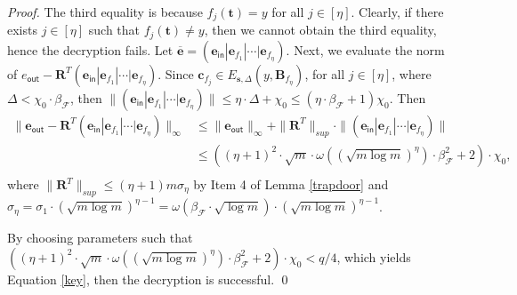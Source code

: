 \documentclass[runningheads,10pt]{llncs}
\begin{document}
\begin{proof}
	The third equality is because  $f_{j}(\textbf{t})=y$  for all $j \in [\eta]$.
		Clearly,  if there exists  $j\in [\eta]$ such that $f_j (\mathbf{t})\neq y$, then we cannot obtain the third equality, hence the decryption fails. 
		 Let $\overline{\textbf{e}}=(\textbf{e}_{\textsf{in}}|\textbf{e}_{f_1}|\cdots|\textbf{e}_{f_\eta})$.
		\fi
Next, we evaluate the norm of $e_{\textsf{out}} -\textbf{R}^T(\textbf{e}_{\textsf{in}}|\textbf{e}_{f_1}|\cdots|\textbf{e}_{f_\eta})$. Since $\textbf{c}_{f_j} \in E_{\textbf{s}, \Delta}(y, \textbf{B}_{f_\eta})$, for all $j \in [\eta]$, where $\Delta<\chi_0\cdot \beta_{\mathcal{F}}$, then $\|(\textbf{e}_{\textsf{in}}|\textbf{e}_{f_1}|\cdots|\textbf{e}_{f_\eta})\| \leq \eta\cdot \Delta+\chi_0\leq (\eta\cdot \beta_{\mathcal{F}}+1)\chi_0.$ 	
	Then
	\begin{equation*}
	\begin{split}
	\|\mathbf{e}_{\textsf{out}} -\textbf{R}^T(\textbf{e}_{\textsf{in}}|\textbf{e}_{f_1}|\cdots|\textbf{e}_{f_\eta})\|_\infty &\leq \|\mathbf{e}_{\textsf{out}}\|_\infty+ \| \textbf{R}^T\|_{sup} \cdot\|(\textbf{e}_{\textsf{in}}|\textbf{e}_{f_1}|\cdots|\textbf{e}_{f_\eta})\|\\
	&\leq ((\eta+1)^2\cdot \sqrt{m}\cdot \omega( (\sqrt{m\log m})^{\eta})\cdot \beta_{\mathcal{F}}^2+2)\cdot \chi_0,\\
\end{split}
	\end{equation*}
where $\| \textbf{R}^T\|_{sup} \leq (\eta+1)m\sigma_\eta$ by Item 4 of Lemma \ref{trapdoor} and $\sigma_\eta=\sigma_1\cdot(\sqrt{m\log m})^{\eta-1}=\omega(\beta_{\mathcal{F}}\cdot \sqrt{\log m})\cdot(\sqrt{m\log m})^{\eta-1}$.
 
By choosing parameters such that $((\eta+1)^2\cdot \sqrt{m}\cdot \omega( (\sqrt{m\log m})^{\eta})\cdot \beta_{\mathcal{F}}^2+2)\cdot \chi_0<q/4$, which yields Equation \eqref{key},
	then the decryption is successful.
 \qed
 \fi 
\end{proof}
\end{document}
